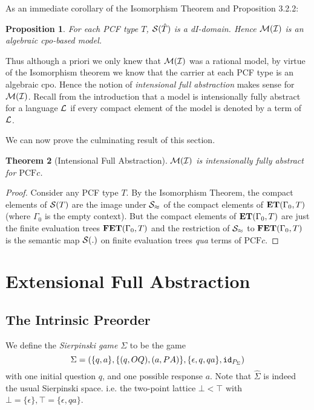 \documentclass[11pt]{article}
\newtheorem{theorem}{Theorem}[section]
\newtheorem{proposition}[theorem]{Proposition}
\newcommand{\pcfc}{\mbox{$\mbox{PCF}c$}}
\begin{document}
As an immediate corollary of the Isomorphism Theorem and Proposition
3.2.2:
\begin{proposition}
For each PCF type $T$, ${\cal S}( \hat{T})$ is a dI-domain. Hence $\cal M(I)$
is an algebraic cpo-based model.
\end{proposition}
Thus although a priori we only knew that $\cal M(I)$ was a rational
model, by virtue of the Isomorphism theorem we know that the carrier
at each PCF type is an algebraic cpo. Hence the notion of {\em
  intensional full abstraction} makes sense for $\cal M(I)$. Recall
from the introduction that a model is intensionally fully abstract for a
language $\cal L$ if every compact element of the model is denoted by
a term of $\cal L$.

We can now prove the culminating result of this section.

\begin{theorem}[Intensional Full Abstraction]

$\cal M(I)$ is intensionally fully abstract for $\pcfc$.
\end{theorem}
\begin{proof} Consider any PCF type $T$. By the Isomorphism Theorem,
the compact elements of ${\cal S}( T)$ are the image under ${\cal
S}_{\approx}$ of the compact elements of ${\bf ET}(\Gamma_0,T)$
(where $\Gamma_0$ is the empty context). But the compact elements
of ${\bf ET}(\Gamma_0,T)$ are just the finite evaluation trees
${\bf FET}(\Gamma_0,T)$ and the restriction of ${\cal
S}_{\approx}$ to ${\bf FET}(\Gamma_0,T)$ is the semantic map ${\cal S}( .)$ on finite evaluation trees {\sl qua} terms of $\pcfc$.
\end{proof}

\section{Extensional Full Abstraction}
\newcommand{\converges}{{\downarrow}}
\newcommand{\Converges}{{\Downarrow}}
\newcommand{\diverges}{{\uparrow}}
\newcommand{\Siepinski}{{\Sigma}}
\subsection{The Intrinsic Preorder}

We define the {\em Sierpinski game} $\Siepinski$ to be the game
$${\Siepinski}=(\{
q,a\},\{(q,OQ),(a,PA)\},\{\epsilon,q,qa\},{\tt id}_{P_{\Siepinski}})$$
with one initial question $q$, and one possible response $a$. Note
that $\hat{\Siepinski}$  is indeed the usual Sierpinski space. i.e. the
two-point lattice $\bot < \top$ with $\bot=\{\epsilon\},
\top=\{\epsilon,qa\}$.
\end{document}
